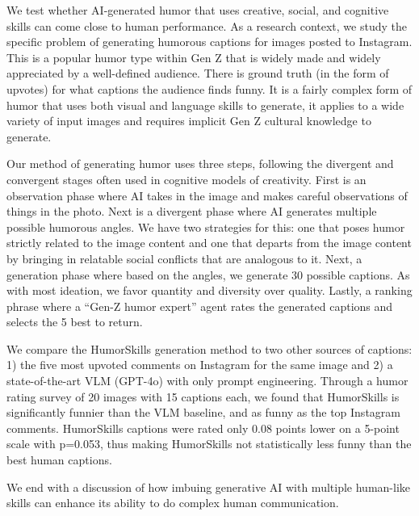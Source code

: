 We test whether AI-generated humor that uses creative, social, and cognitive skills can come close to human performance. As a research context, we study the specific problem of generating humorous captions for images posted to Instagram. This is a popular humor type within Gen Z that is widely made and widely appreciated by a well-defined audience. There is ground truth (in the form of upvotes) for what captions the audience finds funny. It is a fairly complex form of humor that uses both visual and language skills to generate, it applies to a wide variety of input images and requires implicit Gen Z cultural knowledge to generate. 

Our method of generating humor uses three steps, following the divergent and convergent stages often used in cognitive models of creativity. 
First is an observation phase where AI takes in the image and makes careful observations of things in the photo.
Next is a divergent phase where AI generates multiple possible humorous angles. We have two strategies for this: one that poses humor strictly related to the image content and one that departs from the image content by 
bringing in relatable social conflicts that are analogous to it.
Next, a generation phase where based on the angles, we generate 30 possible captions. As with most ideation, we favor quantity and diversity over quality. 
Lastly, a ranking phrase where a ``Gen-Z humor expert'' agent rates the generated captions and selects the 5 best to return. 

We compare the HumorSkills generation method to two other sources of captions: 1) the five most upvoted comments on Instagram for the same image and 2) a state-of-the-art VLM (GPT-4o) with only prompt engineering. Through a humor rating survey of 20 images with 15 captions each, we found that HumorSkills is significantly funnier than the VLM baseline, and as funny as the top Instagram comments. HumorSkills captions were rated only 0.08 points lower on a 5-point scale with p=0.053, thus making HumorSkills not statistically less funny than the best human captions. 

We end with a discussion of how imbuing generative AI with multiple human-like skills can enhance its ability to do complex human communication. 
